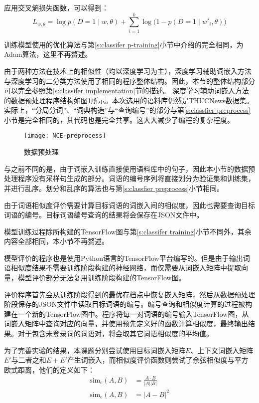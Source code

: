 应用交叉熵损失函数，可以得到：
\begin{equation}
L_{w, \theta} = \log p(D = 1 \mid w, \theta) + \sum_{i = 1}^{k} \log\bigl(1 - p(D = 1 \mid w'_i, \theta)\bigr)
\end{equation}

训练模型使用的优化算法与第\ref{s:classifer p-training}小节中介绍的完全相同，为Adam算法，这里不再赘述。

由于两种方法在技术上的相似性（均以深度学习为主），深度学习辅助词嵌入方法与深度学习的二分类方法使用了相同的程序整体结构。因此，本节的整体结构部分可以完全参照第\ref{s:classifer implementation}节的描述。
深度学习辅助词嵌入方法的数据预处理程序结构如图\ref{f:nce preprocess}所示。本次选用的语料库仍然是THUCNews数据集。实际上，“分局分词”、“词典构造”与“查询编号”的部分与第\ref{s:classfier preprocess}小节是完全相同的，其代码也是完全共享。这大大减少了编程的复杂程度。

\begin{figure}[h]
	\centering
	\texttt{[image: NCE-preprocess]}
	\caption{数据预处理}
	\label{f:nce preprocess}
	\vspace{-1em}
\end{figure}

与之前不同的是，由于词嵌入训练直接使用语料库中的句子，因此本小节的数据预处理程序没有采样句生成的部分。词语的编号序列将直接划分为验证集和训练集，并进行乱序。划分和乱序的算法也与第\ref{s:classfier preprocess}小节相同。

由于词语相似度评价需要计算目标词语的词嵌入间的相似度，因此也需要查询目标词语的编号。目标词语编号查询的结果将会保存在JSON文件中。

模型训练过程除所构建的TensorFlow图与第\ref{s:classifer training}小节不同外，其余内容全部相同，本小节不再赘述。

模型评价的程序也是使用Python语言的TensorFlow平台编写的。但是由于输出词语相似度结果不需要训练阶段构建的神经网络，而仅需要从词嵌入矩阵中提取向量，模型评价部分无法复用训练阶段构建的TensorFlow图。

评价程序首先会从训练阶段得到的最优存档点中恢复嵌入矩阵，然后从数据预处理阶段保存的JSON文件中读取目标词语的编号。编号查询和相似度计算的过程被构建在一个新的TensorFlow图中。程序将每一对词语的编号输入TensorFlow图，从词嵌入矩阵中查询对应的向量，并使用预先定义好的函数计算相似度，最终输出结果。对于包含未登录词的词语对，将会取其它词语相似度的平均值。

为了完善实验的结果，本课题分别尝试使用目标词嵌入矩阵$E$、上下文词嵌入矩阵$E'$与二者之和$E + E'$产生词嵌入，而相似度评价函数则尝试了余弦相似度与平方欧式距离，他们的定义如下：
\begin{align}
\text{sim}_\text{c}(A, B) & = \frac{A \cdot B}{|A| |B|} \\
\text{sim}_\text{e}(A, B) & = |A - B|^2
\end{align}

